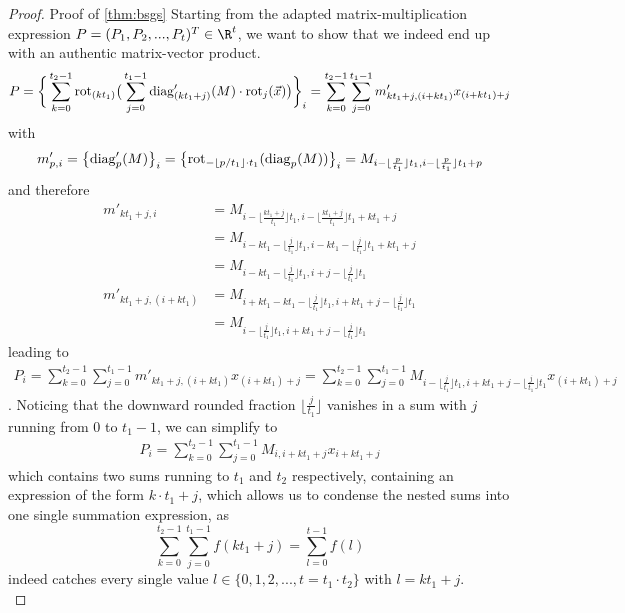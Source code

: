 \begin{proof}{Proof of \autoref{thm:bsgs}}
  Starting from the adapted matrix-multiplication expression $P = (P_1, P_2, ..., P_t)^T \in \R^t$, we want to show that we indeed end up with an authentic matrix-vector product.
  \begin{align*}
    P = \bigg\{\sum_{k=0}^{t_2-1} \mathrm{rot}_{(kt_1)} \big(
    \sum_{j=0}^{t_1-1} \mathrm{diag}'_{(kt_1+j)}(M) \cdot \mathrm{rot}_j(\vec{x})
    \big)\bigg\}_i = \sum_{k=0}^{t_2-1} \sum_{j=0}^{t_1-1} m'_{kt_1+j,(i+kt_1)} x_{(i+kt_1)+j}
  \end{align*}
  with
  \begin{align*}
    m'_{p,i} = \big\{ \mathrm{diag}'_p(M)\big \}_i = \big\{ \mathrm{rot}_{-\lfloor p/t_1 \rfloor \cdot t_1}(\mathrm{diag}_p(M)) \big\}_i
    = M_{i-\lfloor\frac{p}{t_1}\rfloor t_1, i-\lfloor\frac{p}{t_1}\rfloor t_1 + p}
  \end{align*}
  and therefore
  \begin{align*}
    m'_{kt_1+j,i}        & = M_{i-\lfloor\frac{kt_1+j}{t_1}\rfloor t_1, i-\lfloor\frac{kt_1+j}{t_1}\rfloor t_1 + kt_1+j} \\
                         & = M_{i-kt_1-\lfloor\frac{j}{t_1}\rfloor t_1, i-kt_1-\lfloor\frac{j}{t_1}\rfloor t_1 + kt_1+j} \\
                         & = M_{i-kt_1-\lfloor\frac{j}{t_1}\rfloor t_1, i+j-\lfloor\frac{j}{t_1}\rfloor t_1}             \\
    m'_{kt_1+j,(i+kt_1)} & = M_{i+kt_1-kt_1-\lfloor\frac{j}{t_1}\rfloor t_1, i+kt_1+j-\lfloor\frac{j}{t_1}\rfloor t_1}   \\
                         & = M_{i-\lfloor\frac{j}{t_1}\rfloor t_1, i+kt_1+j-\lfloor\frac{j}{t_1}\rfloor t_1}
  \end{align*}
  leading to
  \begin{align*}
    P_i = \sum_{k=0}^{t_2-1} \sum_{j=0}^{t_1-1} m'_{kt_1+j,(i+kt_1)} x_{(i+kt_1)+j}
    = \sum_{k=0}^{t_2-1} \sum_{j=0}^{t_1-1} M_{i-\lfloor\frac{j}{t_1}\rfloor t_1, i+kt_1+j-\lfloor\frac{j}{t_1}\rfloor t_1} x_{(i+kt_1)+j}
  \end{align*}
  . Noticing that the downward rounded fraction $\lfloor\frac{j}{t_1}\rfloor$ vanishes
  in a sum with $j$ running from $0$ to $t_1-1$, we can simplify to
  \begin{align*}
    P_i = \sum_{k=0}^{t_2-1} \sum_{j=0}^{t_1-1} M_{i,i+kt_1+j} x_{i+kt_1+j}
  \end{align*}
  which contains two sums running to $t_1$ and $t_2$ respectively, containing an expression of the form $k \cdot t_1 + j$, which allows us to condense the nested sums into one single summation expression, as $$\sum_{k=0}^{t_2-1} \sum_{j=0}^{t_1-1} f(kt_1+j) = \sum_{l=0}^{t-1} f(l)$$ indeed catches every single value $l \in \{0, 1, 2, ..., t=t_1 \cdot t_2\}$ with $l = kt_1+j$. \\

\end{proof}
